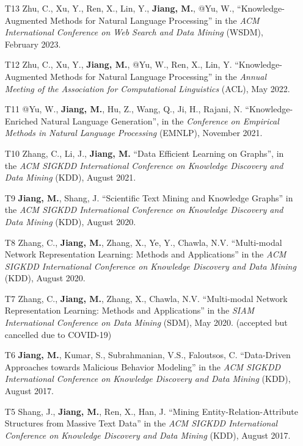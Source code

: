 \documentclass[10pt]{article}
\newenvironment{myindentpar}[1]%
{\begin{list}{}%
         {\setlength{\leftmargin}{#1}}%
         \item[]%
}
{\end{list}}
\newcounter{list}
\begin{document}
\begin{myindentpar}{0.00cm}
\begin{enumerate}[leftmargin=.5cm]
\item[T13] Zhu, C., Xu, Y., Ren, X., Lin, Y., \textbf{Jiang, M.}, @Yu, W., ``Knowledge-Augmented Methods for Natural Language Processing'' in the \textit{ACM International Conference on Web Search and Data Mining} (WSDM), February 2023.

\item[T12] Zhu, C., Xu, Y., \textbf{Jiang, M.}, @Yu, W., Ren, X., Lin, Y. ``Knowledge-Augmented Methods for Natural Language Processing'' in the \textit{Annual Meeting of the Association for Computational Linguistics} (ACL), May 2022.

\item[T11] @Yu, W., \textbf{Jiang, M.}, Hu, Z., Wang, Q., Ji, H., Rajani, N. ``Knowledge-Enriched Natural Language Generation'', in the \textit{Conference on Empirical Methods in Natural Language Processing} (EMNLP), November 2021.

\item[T10] Zhang, C., Li, J., \textbf{Jiang, M.} ``Data Efficient Learning on Graphs'', in the \textit{ACM SIGKDD International Conference on Knowledge Discovery and Data Mining} (KDD), August 2021.
		
\item[T9] \textbf{Jiang, M.}, Shang, J. ``Scientific Text Mining and Knowledge Graphs'' in the \textit{ACM SIGKDD International Conference on Knowledge Discovery and Data Mining} (KDD), August 2020.
		
\item[T8] Zhang, C., \textbf{Jiang, M.}, Zhang, X., Ye, Y., Chawla, N.V. ``Multi-modal Network Representation Learning: Methods and Applications'' in the \textit{ACM SIGKDD International Conference on Knowledge Discovery and Data Mining} (KDD), August 2020.

\item[T7] Zhang, C., \textbf{Jiang, M.}, Zhang, X., Chawla, N.V. ``Multi-modal Network Representation Learning: Methods and Applications'' in the \textit{SIAM International Conference on Data Mining} (SDM), May 2020. (accepted but cancelled due to COVID-19)

\item[T6] \textbf{Jiang, M.}, Kumar, S., Subrahmanian, V.S., Faloutsos, C. ``Data-Driven Approaches towards Malicious Behavior Modeling'' in the \textit{ACM SIGKDD International Conference on Knowledge Discovery and Data Mining} (KDD), August 2017.

\item[T5] Shang, J., \textbf{Jiang, M.}, Ren, X., Han, J. ``Mining Entity-Relation-Attribute Structures from Massive Text Data'' in the \textit{ACM SIGKDD International Conference on Knowledge Discovery and Data Mining} (KDD), August 2017.


\end{enumerate}
\end{myindentpar}
\end{document}
